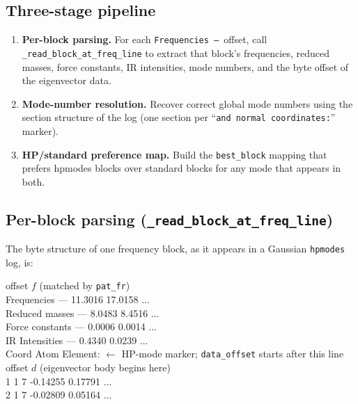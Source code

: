 \documentclass[10pt,a4paper,twoside]{article}
\newcommand{\fn}[1]{\texttt{#1}}
\begin{document}
\subsection{Three-stage pipeline}

\begin{enumerate}
  \item \textbf{Per-block parsing.} For each
        \texttt{Frequencies ---}\ offset, call
        \fn{\_read\_block\_at\_freq\_line} to extract that block's
        frequencies, reduced masses, force constants, IR
        intensities, mode numbers, and the byte offset of the
        eigenvector data.
  \item \textbf{Mode-number resolution.} Recover correct global
        mode numbers using the section structure of the log (one
        section per ``\texttt{and normal coordinates:}'' marker).
  \item \textbf{HP/standard preference map.} Build the
        \texttt{best\_block} mapping that prefers hpmodes blocks
        over standard blocks for any mode that appears in both.
\end{enumerate}

\subsection{Per-block parsing (\fn{\_read\_block\_at\_freq\_line})}

The byte structure of one frequency block, as it appears in a
Gaussian \fn{hpmodes} log, is:

\begin{bytebox}
\hspace*{0.5em}offset $f$ \hfill (matched by \texttt{pat\_fr})\\
       Frequencies ---    11.3016   17.0158   ...\\
    Reduced masses ---     8.0483    8.4516   ...\\
   Force constants ---     0.0006    0.0014   ...\\
    IR Intensities ---     0.4340    0.0239   ...\\
 Coord Atom Element:  $\leftarrow$ HP-mode marker; \texttt{data\_offset} starts after this line\\
\hspace*{0.5em}offset $d$ \hfill (eigenvector body begins here)\\
   1     1     7         -0.14255   0.17791   ...\\
   2     1     7         -0.02809   0.05164   ...\\
\end{bytebox}
\end{document}
